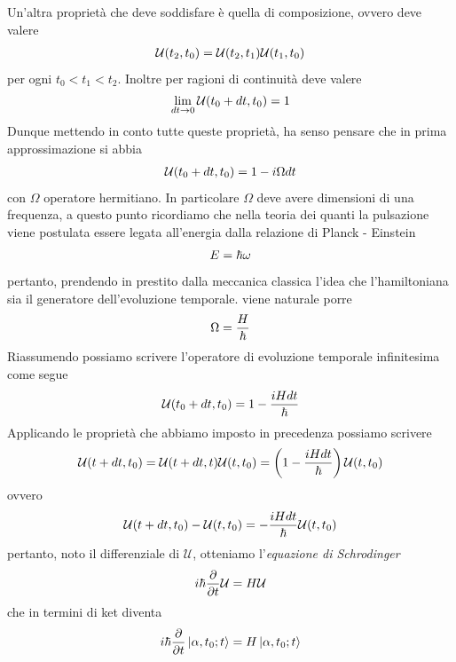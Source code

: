 \documentclass{article}
\begin{document}
Un'altra proprietà che deve soddisfare è quella di composizione, ovvero deve valere
\begin{gather}
    \mathcal{U}(t_2, t_0) = \mathcal{U}(t_2, t_1) \mathcal{U}(t_1, t_0) \notag
\end{gather}
per ogni $t_0 < t_1 < t_2$. Inoltre per ragioni di continuità deve valere
\begin{gather}
    \lim_{dt \rightarrow 0} \mathcal{U}(t_0 + dt, t_0) = 1 \notag
\end{gather}
Dunque mettendo in conto tutte queste proprietà, ha senso pensare che in prima approssimazione si abbia
\begin{gather}
    \mathcal{U}(t_0 + dt, t_0) = 1 - i\Omega dt \notag 
\end{gather}
con $\Omega$ operatore hermitiano. In particolare $\Omega$ deve avere dimensioni di una frequenza, a questo punto ricordiamo che nella teoria dei quanti la pulsazione viene postulata essere legata all'energia dalla relazione di Planck - Einstein
\begin{gather}
    E = \hbar \omega \notag
\end{gather}
pertanto, prendendo in prestito dalla meccanica classica l'idea che l'hamiltoniana sia il generatore dell'evoluzione temporale. viene naturale porre
\begin{gather}
    \Omega = \frac{H}{\hbar} \notag
\end{gather}
Riassumendo possiamo scrivere l'operatore di evoluzione temporale infinitesima come segue
\begin{gather}
    \mathcal{U}(t_0 + dt, t_0) = 1 - \frac{iHdt}{\hbar} \notag
\end{gather}
Applicando le proprietà che abbiamo imposto in precedenza possiamo scrivere
\begin{gather}
    \mathcal{U}(t + dt, t_0) = \mathcal{U}(t + dt, t)\mathcal{U}(t, t_0) = \left( 1 - \frac{iHdt}{\hbar} \right)\mathcal{U}(t, t_0) \notag
\end{gather}
ovvero
\begin{gather}
    \mathcal{U}(t + dt, t_0) - \mathcal{U}(t, t_0) = -\frac{iHdt}{\hbar}\mathcal{U}(t, t_0) \notag
\end{gather}
pertanto, noto il differenziale di $\mathcal{U}$, otteniamo l'\textit{equazione di Schrodinger}
\begin{gather}
    i\hbar\frac{\partial}{\partial t}\mathcal{U} = H\mathcal{U} \notag
\end{gather}
che in termini di ket diventa
\begin{gather}
    i\hbar \frac{\partial}{\partial t}\ket{\alpha, t_0; t} = H\ket{\alpha, t_0; t} \notag
\end{gather}
\end{document}
